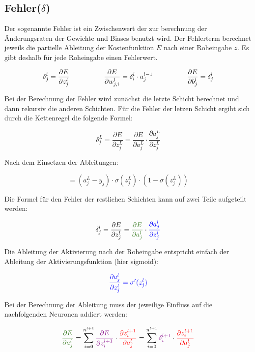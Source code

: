 \documentclass{article}
\begin{document}
\subsection{Fehler($\delta$)}
\begin{flushleft}
Der sogenannte Fehler ist ein Zwischenwert der zur berechnung der Änderungsraten der Gewichte und Biases benutzt wird.
Der Fehlerterm berechnet jeweils die partielle Ableitung der Kostenfunktion $E$ nach einer Roheingabe $z$. Es gibt deshalb
für jede Roheingabe einen Fehlerwert.
\end{flushleft}
\[ \delta_j^l = \frac{\partial E}{\partial z_j^l} 
\kern 50pt
 \frac{\partial E}{\partial w_{j,i}^l} = \delta_i^l \cdot a_j^{l-1}
\kern 50pt
\frac{\partial E}{\partial b_j^l} = \delta_j^l \]
\begin{flushleft}
Bei der Berechnung der Fehler wird zunächst die letzte Schicht berechnet und dann rekursiv die anderen Schichten.
Für die Fehler der letzen Schicht ergibt sich durch die Kettenregel die folgende Formel:
\end{flushleft}
\[ \delta_j^L  = \frac{\partial E}{\partial z_j^L}
= \frac{\partial E}{\partial a_j^L} \cdot \frac{\partial a_j^L}{\partial z_j^L}\]
\begin{flushleft}
Nach dem Einsetzen der Ableitungen:
\end{flushleft}
\[ = (a_j^L - y_j) \cdot \sigma (z_j^L) \cdot (1 - \sigma (z_j^L)) \]
\begin{flushleft}
Die Formel für den Fehler der restlichen Schichten kann auf zwei Teile aufgeteilt werden:
\end{flushleft}
\[ \delta_j^{l}  = \frac{\partial E}{\partial z_j^{l}} 
= \textcolor{OliveGreen}{\frac{\partial E}{\partial a_j^{l}}} \cdot \textcolor{blue}{\frac{\partial a_j^{l}}{\partial z_j^{l}}} \]
\begin{flushleft}
    Die Ableitung der Aktivierung nach der Roheingabe entspricht einfach der Ableitung der Aktivierungsfunktion (hier sigmoid):
\end{flushleft}
\[ \textcolor{blue}{\frac{\partial a_j^{l}}{\partial z_j^{l}} = \sigma^{\prime}(z_j^{l})} \]
\begin{flushleft}
    Bei der Berechnung der Ableitung muss der jeweilige Einfluss auf die nachfolgenden Neuronen addiert werden:
\end{flushleft}
\[ \textcolor{OliveGreen}{ \frac{\partial E}{\partial a_j^{l}}} = \sum_{i 
= 0}^{n^{l+1}} \textcolor{Plum}{\frac{\partial E}{\partial z_i^{l+1}}} \cdot \textcolor{red}{\frac{\partial z_i^{l+1}}{\partial a_j^{l}}} 
= \sum_{i = 0}^{n^{l+1}} \textcolor{Plum}{\delta_i^{l+1}} \cdot \textcolor{red}{ \frac{\partial z_i^{l+1}}{\partial a_j^{l}} } \]
\end{document}
